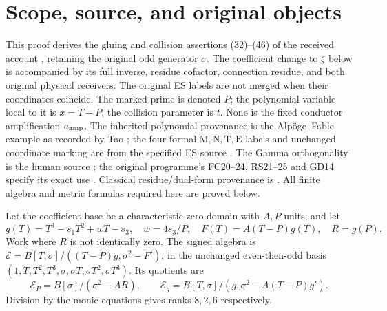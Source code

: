 \documentclass[11pt]{article}
\begin{document}
\section{Scope, source, and original objects}
This proof derives the gluing and collision assertions (32)--(46) of the
received account \cite{DefiningPrimeReceived}, retaining the original odd generator
$\sigma$. The coefficient change to $\zeta$ below is accompanied by its full
inverse, residue cofactor, connection residue, and both original physical
receivers. The original ES labels are not merged when their coordinates
coincide. The marked prime is denoted $P$; the polynomial variable local to
it is $x=T-P$; the collision parameter is $t$. None is the fixed conductor
amplification $a_{\rm amp}$. The inherited polynomial provenance is the
Alp\"oge--Fable example as recorded by Tao \cite{Tao}; the four formal
$\mathrm M,\mathrm N,\mathrm T,\mathrm E$ labels and unchanged coordinate
marking are from the specified ES source \cite{ES488}. The Gamma orthogonality
is the human source \cite{DLMF18Source}; the original programme's FC20--24,
RS21--25 and GD14 specify its exact use \cite{Fable050}. Classical
residue/dual-form provenance is \cite[Section 2]{JouveRV}. All finite
algebra and metric formulas required here are proved below.

Let the coefficient base be a characteristic-zero domain with $A,P$ units,
and let
\begin{equation}
 g(T)=T^3-s_1T^2+wT-s_3,\quad w=4s_3/P,\quad
 F(T)=A(T-P)g(T),\quad R=g(P).
 \tag{ECC1}
\end{equation}
Work where $R$ is not identically zero. The signed algebra is
$\mathscr E=B[T,\sigma]/((T-P)g,\sigma^2-F')$, in the unchanged even-then-odd
basis $(1,T,T^2,T^3,\sigma,\sigma T,\sigma T^2,\sigma T^3)$.
Its quotients are
\begin{equation}
 \mathscr E_P=B[\sigma]/(\sigma^2-AR),\qquad
 \mathscr E_g=B[T,\sigma]/(g,\sigma^2-A(T-P)g').
 \tag{ECC2}
\end{equation}
Division by the monic equations gives ranks $8,2,6$ respectively.
\end{document}
